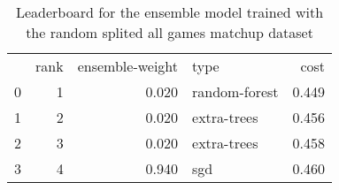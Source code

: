 \begin{table}[]
	\centering
	\begin{tabular}{lrrlr}
		  & rank & ensemble-weight & type          & cost  \\
		0 & 1    & 0.020           & random-forest & 0.449 \\
		1 & 2    & 0.020           & extra-trees   & 0.456 \\
		2 & 3    & 0.020           & extra-trees   & 0.458 \\
		3 & 4    & 0.940           & sgd           & 0.460 \\
	\end{tabular}

	\caption{Leaderboard for the ensemble model trained with the random splited all games matchup dataset}
	\label{tab:lb-all-games-matchups-randsplit}
\end{table}

